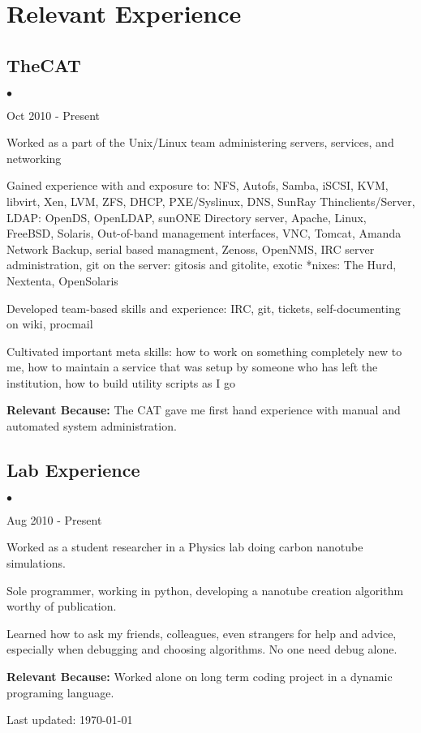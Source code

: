 \documentclass[10pt,letterpaper]{article}
\renewenvironment{itemize}{
  \begin{list}{}{
    \setlength{\leftmargin}{1.5em}
    \setlength{\itemsep}{0.25em}
    \setlength{\parskip}{0pt}
    \setlength{\parsep}{0.25em}
  }
}{
  \end{list}
}
\begin{document}
\renewenvironment{itemize}{
  \begin{list}{$\bullet$}{
    \setlength{\leftmargin}{1.5em}
    \setlength{\itemsep}{0.25em}
    \setlength{\parskip}{0pt}
    \setlength{\parsep}{0.25em}
  }
}{
  \end{list}
}
\section*{Relevant Experience}

\subsection*{TheCAT}
\begin{itemize}

    \item Oct 2010 - Present
    \item Worked as a part of the Unix/Linux team administering servers, services, and networking
    \item Gained experience with and exposure to: NFS, Autofs, Samba, iSCSI, KVM, libvirt, Xen, LVM, ZFS, DHCP, PXE/Syslinux, DNS, SunRay Thinclients/Server, LDAP: OpenDS, OpenLDAP, sunONE Directory server, Apache, Linux, FreeBSD, Solaris, Out-of-band management interfaces, VNC, Tomcat, Amanda Network Backup, serial based managment, Zenoss, OpenNMS, IRC server administration, git on the server: gitosis and gitolite, exotic *nixes: The Hurd, Nextenta, OpenSolaris
    \item Developed team-based skills and experience: IRC, git, tickets, self-documenting on wiki, procmail
    \item Cultivated important meta skills: how to work on something completely new to me, how to maintain a service that was setup by someone who has left the institution, how to build utility scripts as I go

    \item \textbf{Relevant Because:} The CAT gave me first hand experience with manual and automated system administration. 
 
\end{itemize}

\subsection*{Lab Experience}
\begin{itemize}

    \item Aug 2010 - Present
    \item Worked as a student researcher in a Physics lab doing carbon nanotube simulations.
    \item Sole programmer, working in python, developing a nanotube creation algorithm worthy of publication.
    \item Learned how to ask my friends, colleagues, even strangers for help and advice, especially when debugging and choosing algorithms. No one need debug alone.
    \item \textbf{Relevant Because:} Worked alone on long term coding project in a dynamic programing language.

\end{itemize}


\bigskip

\begin{center}
  \begin{small}
    Last updated: \today
  \end{small}
\end{center}
\end{document}

